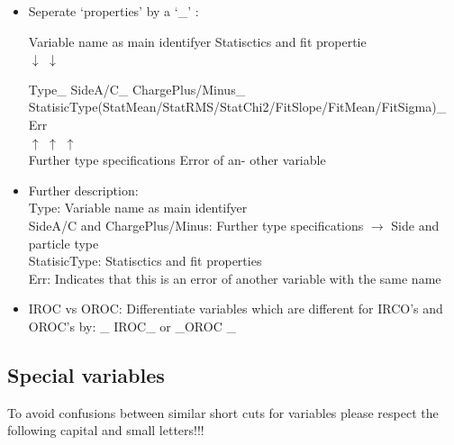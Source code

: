 \documentclass[11pt,a4paper]{article}
\begin{document}
\begin{itemize}

\item Seperate `properties' by a `\_' : \\ \setlength{\parskip}{1pt} 

Variable name as main identifyer \hspace*{3cm} Statisctics and fit propertie  \\ 
\hspace*{0.3cm} $ \downarrow $ \hspace*{10cm} $ \downarrow $ 

 \small{Type\_ SideA/C\_ ChargePlus/Minus\_ StatisicType(StatMean/StatRMS/StatChi2/FitSlope/FitMean/FitSigma)\_ Err} \\ 
 \hspace*{1.5cm} $ \uparrow $\hspace*{2cm} $ \uparrow $ \hspace*{13.1cm} $ \uparrow $ \\
 \hspace*{1cm} Further type specifications \hspace*{10cm} Error of an-\hspace*{15.5cm} other variable
 
\item Further description: \\
     Type: Variable name as main identifyer \\
     SideA/C and ChargePlus/Minus: Further type specifications $ \rightarrow $ Side and particle type \\
     StatisicType: Statisctics and fit properties \\
     Err: Indicates that this is an error of another variable with the same name \\
      
 \item IROC vs OROC: Differentiate variables which are different for IRCO's and OROC's by: \_ IROC\_ or \_OROC \_

\end{itemize}

\subsection{Special variables}

To avoid confusions between similar short cuts for variables please respect the following capital and small letters!!!
\end{document}
